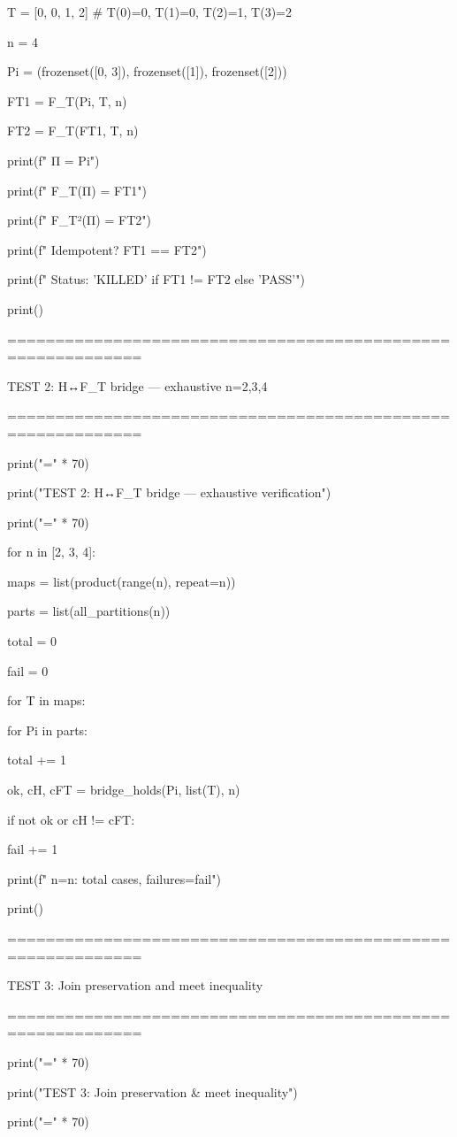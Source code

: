 T = [0, 0, 1, 2]  # T(0)=0, T(1)=0, T(2)=1, T(3)=2

n = 4

Pi = (frozenset([0, 3]), frozenset([1]), frozenset([2]))


FT1 = F_T(Pi, T, n)

FT2 = F_T(FT1, T, n)


print(f"  Π     = {Pi}")

print(f"  F_T(Π)   = {FT1}")

print(f"  F_T²(Π)  = {FT2}")

print(f"  Idempotent? {FT1 == FT2}")

print(f"  Status: {'KILLED' if FT1 != FT2 else 'PASS'}")

print()


============================================================


TEST 2: H↔F_T bridge — exhaustive n=2,3,4


============================================================


print("=" * 70)

print("TEST 2: H↔F_T bridge — exhaustive verification")

print("=" * 70)


for n in [2, 3, 4]:

maps = list(product(range(n), repeat=n))

parts = list(all_partitions(n))

total = 0

fail = 0

for T in maps:

for Pi in parts:

total += 1

ok, cH, cFT = bridge_holds(Pi, list(T), n)

if not ok or cH != cFT:

fail += 1

print(f"  n={n}: {total} cases, failures={fail}")


print()


============================================================


TEST 3: Join preservation and meet inequality


============================================================


print("=" * 70)

print("TEST 3: Join preservation & meet inequality")

print("=" * 70)


